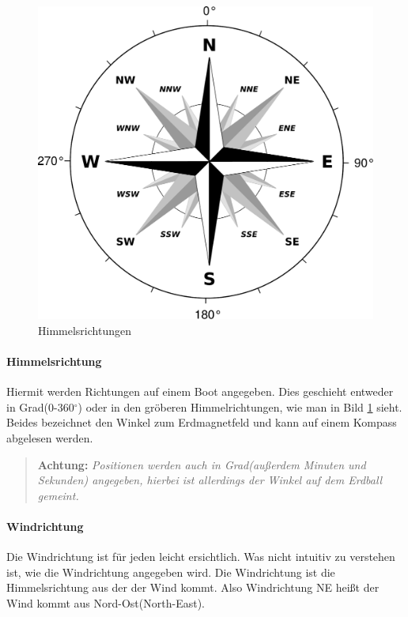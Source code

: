 \documentclass[12pt]{article}
\begin{document}
\begin{figure}[H]
\begin{center}
\includegraphics[scale=0.4]{bilder/windrose.pdf}
\caption{Himmelsrichtungen}
\label{himmelsrichtungen}
\end{center}
\end{figure}

\paragraph{Himmelsrichtung}
Hiermit werden Richtungen auf einem Boot angegeben. Dies geschieht entweder in Grad(0-360$^\circ$) oder in den gröberen Himmelrichtungen, wie man in Bild \ref{himmelsrichtungen} sieht. Beides bezeichnet den Winkel zum Erdmagnetfeld und kann auf einem Kompass abgelesen werden.

\begin{quote}
\textbf{Achtung:} \textit{Positionen werden auch in Grad(außerdem Minuten und Sekunden) angegeben, hierbei ist allerdings der Winkel auf dem Erdball gemeint.}
\end{quote}

\paragraph{Windrichtung}
Die Windrichtung ist für jeden leicht ersichtlich. Was nicht intuitiv zu verstehen ist, wie die Windrichtung angegeben wird. Die Windrichtung ist die Himmelsrichtung aus der der Wind kommt. Also Windrichtung NE heißt der Wind kommt aus Nord-Ost(North-East).
\end{document}
